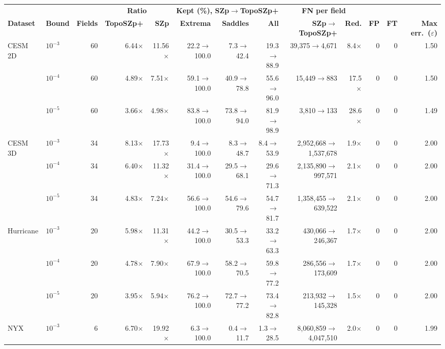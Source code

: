 \begin{tabular}{@{}llrrrrrrrrrrr@{}}
\toprule
 & & & \multicolumn{2}{c}{\textbf{Ratio}} & \multicolumn{3}{c}{\textbf{Kept (\%), SZp$\to$TopoSZp+}} & \multicolumn{2}{c}{\textbf{FN per field}} & & & \\
\cmidrule(lr){4-5}\cmidrule(lr){6-8}\cmidrule(lr){9-10}
\textbf{Dataset} & \textbf{Bound} & \textbf{Fields} & \textbf{TopoSZp+} & \textbf{SZp} & \textbf{Extrema} & \textbf{Saddles} & \textbf{All} & \textbf{SZp$\to$TopoSZp+} & \textbf{Red.} & \textbf{FP} & \textbf{FT} & \textbf{Max err.\ ($\varepsilon$)} \\
\midrule
CESM 2D & $10^{-3}$ & 60 & 6.44$\times$ & 11.56$\times$ & 22.2$\to$100.0 & 7.3$\to$42.4 & 19.3$\to$88.9 & 39{,}375$\to$4{,}671 & 8.4$\times$ & 0 & 0 & 1.50 \\
 & $10^{-4}$ & 60 & 4.89$\times$ & 7.51$\times$ & 59.1$\to$100.0 & 40.9$\to$78.8 & 55.6$\to$96.0 & 15{,}449$\to$883 & 17.5$\times$ & 0 & 0 & 1.50 \\
 & $10^{-5}$ & 60 & 3.66$\times$ & 4.98$\times$ & 83.8$\to$100.0 & 73.8$\to$94.0 & 81.9$\to$98.9 & 3{,}810$\to$133 & 28.6$\times$ & 0 & 0 & 1.49 \\
\midrule
CESM 3D & $10^{-3}$ & 34 & 8.13$\times$ & 17.73$\times$ & 9.4$\to$100.0 & 8.3$\to$48.7 & 8.4$\to$53.9 & 2{,}952{,}668$\to$1{,}537{,}678 & 1.9$\times$ & 0 & 0 & 2.00 \\
 & $10^{-4}$ & 34 & 6.40$\times$ & 11.32$\times$ & 31.4$\to$100.0 & 29.5$\to$68.1 & 29.6$\to$71.3 & 2{,}135{,}890$\to$997{,}571 & 2.1$\times$ & 0 & 0 & 2.00 \\
 & $10^{-5}$ & 34 & 4.83$\times$ & 7.24$\times$ & 56.6$\to$100.0 & 54.6$\to$79.6 & 54.7$\to$81.7 & 1{,}358{,}455$\to$639{,}522 & 2.1$\times$ & 0 & 0 & 2.00 \\
\midrule
Hurricane & $10^{-3}$ & 20 & 5.98$\times$ & 11.31$\times$ & 44.2$\to$100.0 & 30.5$\to$53.3 & 33.2$\to$63.3 & 430{,}066$\to$246{,}367 & 1.7$\times$ & 0 & 0 & 2.00 \\
 & $10^{-4}$ & 20 & 4.78$\times$ & 7.90$\times$ & 67.9$\to$100.0 & 58.2$\to$70.5 & 59.8$\to$77.2 & 286{,}556$\to$173{,}609 & 1.7$\times$ & 0 & 0 & 2.00 \\
 & $10^{-5}$ & 20 & 3.95$\times$ & 5.94$\times$ & 76.2$\to$100.0 & 72.7$\to$77.2 & 73.4$\to$82.8 & 213{,}932$\to$145{,}328 & 1.5$\times$ & 0 & 0 & 2.00 \\
\midrule
NYX & $10^{-3}$ & 6 & 6.70$\times$ & 19.92$\times$ & 6.3$\to$100.0 & 0.4$\to$11.7 & 1.3$\to$28.5 & 8{,}060{,}859$\to$4{,}047{,}510 & 2.0$\times$ & 0 & 0 & 1.99 \\

\end{tabular}
